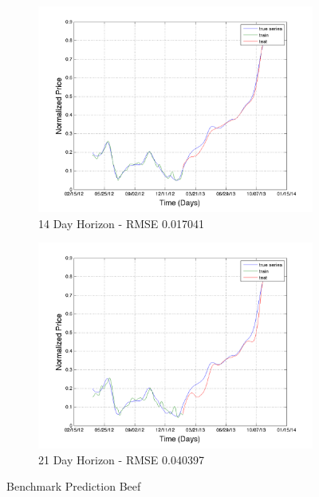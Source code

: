 \begin{figure}
       \hfill
       
        \begin{subfigure}[b]{0.5\textwidth}
                \includegraphics[width=\textwidth]{img/model/beef/model1/pred_14}
                \caption{14 Day Horizon - RMSE 0.017041}
                \label{fig:mouse}
        \end{subfigure}%
         \begin{subfigure}[b]{0.5\textwidth}
                \includegraphics[width=\textwidth]{img/model/beef/model1/pred_21}
                \caption{21 Day Horizon - RMSE 0.040397}
                \label{fig:mouse}
        \end{subfigure}
        \caption{Benchmark Prediction Beef}
        \label{fig:beef_1}
\end{figure}




